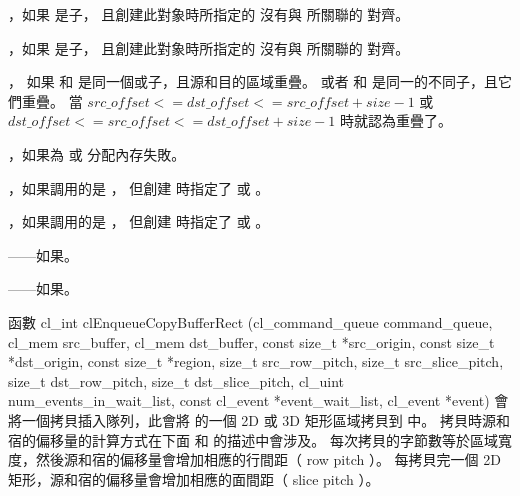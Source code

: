 \item {}，如果  是子，
  且創建此對象時所指定的  沒有與  所關聯的  對齊。

\item {}，如果  是子，
  且創建此對象時所指定的  沒有與  所關聯的  對齊。

\item {}，
  如果  和  是同一個或子，且源和目的區域重疊。
  或者  和  是同一的不同子，且它們重疊。
  當 $src\_offset <= dst\_offset <= src\_offset + size - 1$ 或
  $dst\_offset <= src\_offset <= dst\_offset + size - 1$ 時就認為重疊了。

\item {}，如果為  或  分配內存失敗。

\item {}，如果調用的是 ，
  但創建  時指定了  或 。

\item {}，如果調用的是 ，
  但創建  時指定了  或 。

\item {}——如果\scdevfailres。
\item {}——如果\schostfailres。
\stopigBase

函數
\startclc
cl_int clEnqueueCopyBufferRect (cl_command_queue command_queue,
			cl_mem src_buffer,
			cl_mem dst_buffer,
			const size_t *src_origin,
			const size_t *dst_origin,
			const size_t *region,
			size_t src_row_pitch,
			size_t src_slice_pitch,
			size_t dst_row_pitch,
			size_t dst_slice_pitch,
			cl_uint num_events_in_wait_list,
			const cl_event *event_wait_list,
			cl_event *event)
\stopclc
會將一個拷貝插入隊列，此會將  的一個 2D 或 3D 矩形區域拷貝到  中。
拷貝時源和宿的偏移量的計算方式在下面  和  的描述中會涉及。
每次拷貝的字節數等於區域寬度，然後源和宿的偏移量會增加相應的行間距（ row pitch ）。
每拷貝完一個 2D 矩形，源和宿的偏移量會增加相應的面間距（ slice pitch ）。

